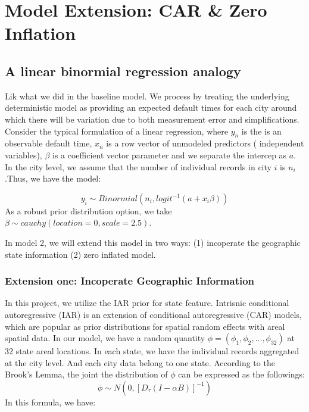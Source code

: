 \documentclass[]{tufte-handout}
\begin{document}
\hypertarget{model-extension-car-zero-inflation}{%
\section{Model Extension: CAR \& Zero
Inflation}\label{model-extension-car-zero-inflation}}

\hypertarget{a-linear-binormial-regression-analogy}{%
\subsection{A linear binormial regression
analogy}\label{a-linear-binormial-regression-analogy}}

Lik what we did in the baseline model. We process by treating the
underlying deterministic model as providing an expected default times
for each city around which there will be variation due to both
measurement error and simplifications. Consider the typical formulation
of a linear regression, where \(y_n\) is the is an observable default
time, \(x_n\) is a row vector of unmodeled predictors ( independent
variables), \(\beta\) is a coefficient vector parameter and we separate
the intercep as \(a\). In the city level, we assume that the number of
individual records in city \(i\) is \(n_i\).Thus, we have the model:

\[ y_i \sim Binormial(n_{i},logit^{-1}(a + x_i\beta)) \] As a robust
prior distribution option, we take
\(\beta \sim cauchy(location=0,scale=2.5)\).

In model 2, we will extend this model in two ways: (1) incoperate the
geographic state information (2) zero inflated model.

\hypertarget{extension-one-incoperate-geographic-information}{%
\subsubsection{Extension one: Incoperate Geographic
Information}\label{extension-one-incoperate-geographic-information}}

In this project, we utilize the IAR prior for state feature. Intrisnic
conditional autoregressive (IAR) is an extension of conditional
autoregressive (CAR) models, which are popular as prior distributions
for spatial random effects with areal spatial data. In our model, we
have a random quantity \(\phi = (\phi_1,\phi_2,...,\phi_{32})\) at 32
state areal locations. In each state, we have the individual records
aggregated at the city level. And each city data belong to one state.
According to the Brook's Lemma, the joint the distribution of \(\phi\)
can be expressed as the followings:
\[\phi \sim N(0,[D_{\tau} (I-\alpha B)]^{-1})\] In this formula, we
have:
\end{document}

